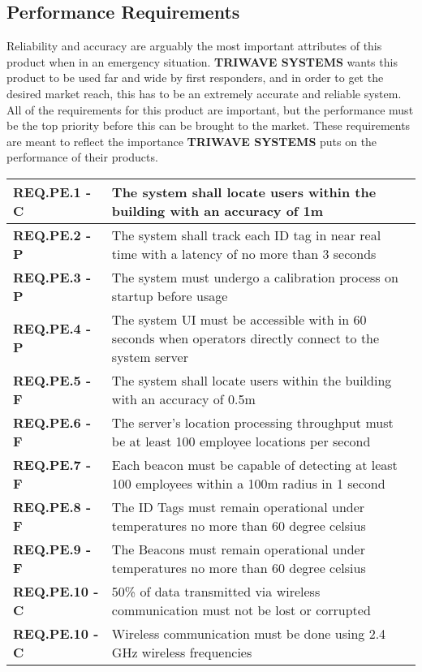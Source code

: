 \subsection{Performance Requirements}
Reliability and accuracy are arguably the most important attributes of this product when in an emergency situation. \textbf{TRIWAVE SYSTEMS} wants this product to be used far and wide by first responders, and in order to get the desired market reach, this has to be an extremely accurate and reliable system. All of the requirements for this product are important, but the performance must be the top priority before this can be brought to the market. These requirements are meant to reflect the importance \textbf{TRIWAVE SYSTEMS} puts on the performance of their products.
\bgroup
\def\arraystretch{1.5}
\begin{table}[H]
\centering
\begin{tabular}{ | m{3.5cm} | m{12.5cm} | }
 \hline
 \textbf{ REQ.PE.1 - C } & The system shall locate users within the building with an accuracy of 1m \\
\hline
 \textbf{ REQ.PE.2 - P} & The system shall track each ID tag in near real time with a latency of no more than 3 seconds \\
\hline
 \textbf{ REQ.PE.3 - P } & The system must undergo a calibration process on startup before usage \\
\hline
 \textbf{ REQ.PE.4 - P} & The system UI must be accessible with in 60 seconds when operators directly connect to the system server \\
\hline
 \textbf{ REQ.PE.5 - F} & The system shall locate users within the building with an accuracy of 0.5m \\
\hline
 \textbf{ REQ.PE.6 - F } & The server's location processing throughput must be at least 100 employee locations per second \\
\hline
 \textbf{ REQ.PE.7 - F } & Each beacon must be capable of detecting at least 100 employees within a 100m radius in 1 second \\
\hline
 \textbf{ REQ.PE.8 - F } & The ID Tags must remain operational under temperatures no more than 60 degree celsius \\
\hline
 \textbf{ REQ.PE.9 - F } & The Beacons must remain operational under temperatures no more than 60 degree celsius \\
\hline
 \textbf{ REQ.PE.10 - C } & 50\% of data transmitted via wireless communication must not be lost or corrupted \\
\hline
 \textbf{ REQ.PE.10 - C } & Wireless communication must be done using 2.4 GHz wireless frequencies \\

\end{tabular}
\end{table}
